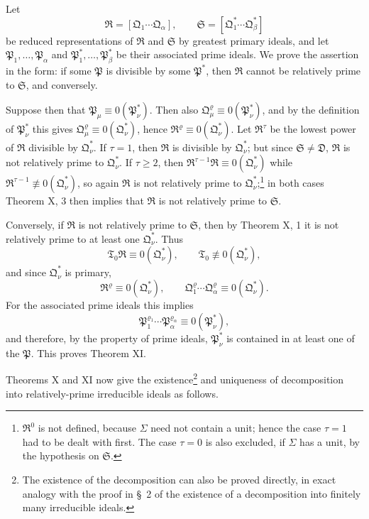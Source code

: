 \documentclass[11pt]{article}
\newcommand{\ideal}[1]{\mathfrak{#1}}
\begin{document}
Let
\[
 \ideal R=[\ideal Q_1\cdots\ideal Q_\alpha],
 \qquad
 \ideal S=[\ideal Q_1^*\cdots\ideal Q_\beta^*]
\]
be reduced representations of $\ideal R$ and $\ideal S$ by greatest primary ideals, and let $\ideal P_1,
\ldots,\ideal P_\alpha$ and $\ideal P_1^*,
\ldots,\ideal P_\beta^*$ be their associated prime ideals. We prove the assertion in the form: if some $\ideal P$ is divisible by some $\ideal P^*$, then $\ideal R$ cannot be relatively prime to $\ideal S$, and conversely.

Suppose then that $\ideal P_\mu\equiv0(\ideal P_\nu^*)$. Then also $\ideal Q_\mu^{\varrho}\equiv0(\ideal P_\nu^*)$, and by the definition of $\ideal P_\nu^*$ this gives $\ideal Q_\mu^{\varrho}\equiv0(\ideal Q_\nu^*)$, hence $\ideal R^{\varrho}\equiv0(\ideal Q_\nu^*)$. Let $\ideal R^\tau$ be the lowest power of $\ideal R$ divisible by $\ideal Q_\nu^*$. If $\tau=1$, then $\ideal R$ is divisible by $\ideal Q_\nu^*$; but since $\ideal S\ne\ideal D$, $\ideal R$ is not relatively prime to $\ideal Q_\nu^*$. If $\tau\ge2$, then $\ideal R^{\tau-1}\ideal R\equiv0(\ideal Q_\nu^*)$ while $\ideal R^{\tau-1}\not\equiv0(\ideal Q_\nu^*)$, so again $\ideal R$ is not relatively prime to $\ideal Q_\nu^*$;\footnote{$\ideal R^0$ is not defined, because $\Sigma$ need not contain a unit; hence the case $\tau=1$ had to be dealt with first. The case $\tau=0$ is also excluded, if $\Sigma$ has a unit, by the hypothesis on $\ideal S$.} in both cases Theorem X, 3 then implies that $\ideal R$ is not relatively prime to $\ideal S$.

Conversely, if $\ideal R$ is not relatively prime to $\ideal S$, then by Theorem X, 1 it is not relatively prime to at least one $\ideal Q_\nu^*$. Thus
\[
 \ideal T_0\ideal R\equiv0(\ideal Q_\nu^*),
 \qquad
 \ideal T_0\not\equiv0(\ideal Q_\nu^*),
\]
and since $\ideal Q_\nu^*$ is primary,
\[
 \ideal R^\varrho\equiv0(\ideal Q_\nu^*),
 \qquad
 \ideal Q_1^\varrho\cdots\ideal Q_\alpha^\varrho\equiv0(\ideal Q_\nu^*).
\]
For the associated prime ideals this implies
\[
 \ideal P_1^{\varrho_1}\cdots\ideal P_\alpha^{\varrho_\alpha}\equiv0(\ideal P_\nu^*),
\]
and therefore, by the property of prime ideals, $\ideal P_\nu^*$ is contained in at least one of the $\ideal P$. This proves Theorem XI.

Theorems X and XI now give the existence\footnote{The existence of the decomposition can also be proved directly, in exact analogy with the proof in \S~2 of the existence of a decomposition into finitely many irreducible ideals.} and uniqueness of decomposition into relatively-prime irreducible ideals as follows.
\end{document}
